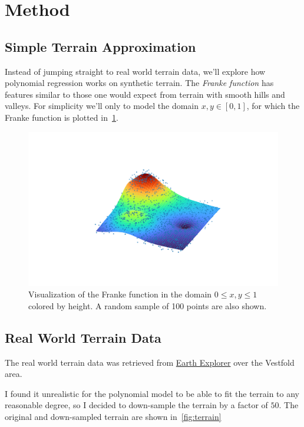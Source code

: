 \section{Method}\label{sec:Method}


\subsection{Simple Terrain Approximation}

Instead of jumping straight to real world terrain data, we'll explore how
polynomial regression works on synthetic terrain. The \textit{Franke function}
has features similar to those one would expect from terrain with smooth hills
and valleys. For simplicity we'll only to model the domain \(x, y \in [0,
1]\), for which the Franke function is plotted in~\cref{fig:franke}.


\begin{figure}[]
  \centering
  \includegraphics[trim={2cm 1cm 1cm 1cm},clip]{figures/franke.png}
  \caption{\label{fig:franke} Visualization of the Franke function in the domain
   \(0 \leq x, y \leq 1\) colored by height. A random sample of 100 points are
   also shown.}
\end{figure}

\subsection{Real World Terrain Data}
\label{sec:real-world-terrain}

The real world terrain data was retrieved from
\href{https://earthexplorer.usgs.gov/}{Earth Explorer} over the Vestfold area.

I found it unrealistic for the polynomial model to be able to fit the terrain to
any reasonable degree, so I decided to down-sample the terrain by a factor of
\(50\). The original and down-sampled terrain are shown in~\cref{fig:terrain}

